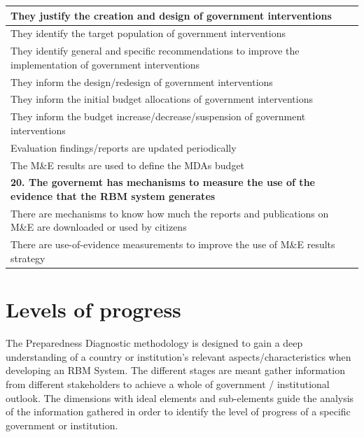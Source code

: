 \documentclass[
  10pt,
]{book}
\begin{document}
\begin{table}
\begin{tabular}[t]{l}
\hline
\hspace{1em}They justify the creation and design of government interventions\\
\hline
\hspace{1em}They identify the target population of government interventions\\
\hline
\hspace{1em}They identify general and specific recommendations to improve the implementation of government interventions\\
\hline
\hspace{1em}They inform the design/redesign of government interventions\\
\hline
\hspace{1em}They inform the initial budget allocations of government interventions\\
\hline
\hspace{1em}They inform the budget increase/decrease/suspension of government interventions\\
\hline
\hspace{1em}Evaluation findings/reports are updated periodically\\
\hline
\hspace{1em}The M\&E results are used to define the MDAs budget\\
\hline
\multicolumn{1}{l}{\textbf{20. The governemt has mechanisms to measure the use of the evidence that the RBM system generates}}\\
\hline
\hspace{1em}There are mechanisms to know how much the reports and publications on M\&E are downloaded or used by citizens\\
\hline
\hspace{1em}There are use-of-evidence measurements to improve the use of M\&E results strategy\\
\hline
\end{tabular}
\end{table}

\hypertarget{levels-of-progress}{%
\section{Levels of progress}\label{levels-of-progress}}

The Preparedness Diagnostic methodology is designed to gain a deep understanding of a country or institution's relevant aspects/characteristics when developing an RBM System. The different stages are meant gather information from different stakeholders to achieve a whole of government / institutional outlook. The dimensions with ideal elements and sub-elements guide the analysis of the information gathered in order to identify the level of progress of a specific government or institution.
\end{document}
